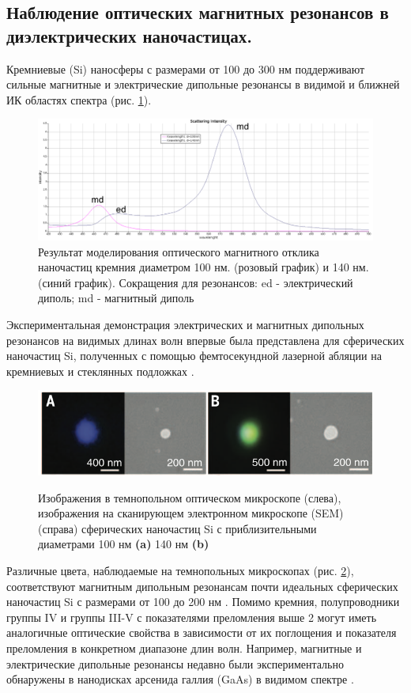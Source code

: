 \subsection*{Наблюдение оптических магнитных резонансов в диэлектрических наночастицах.}


Кремниевые (Si) наносферы с размерами от 100 до 300 нм поддерживают сильные магнитные и электрические дипольные резонансы в видимой и ближней ИК областях спектра (рис. \ref{fig2}). 
 \begin{figure}[h]
	\centering
	\includegraphics[width=1\linewidth]{images/graph1.png}
	\caption{Результат моделирования оптического магнитного отклика наночастиц кремния  диаметром 100 нм. (розовый график) и 140 нм. (синий график).  Сокращения для резонансов: ed - электрический диполь; md - магнитный диполь}
	\label{fig2}
\end{figure}
Экспериментальная демонстрация электрических и магнитных дипольных резонансов на видимых длинах волн впервые была представлена для сферических наночастиц Si, полученных с помощью фемтосекундной лазерной абляции на кремниевых и стеклянных подложках \cite{kuznetsov2012luk}. 
 \begin{figure}[h]
	\centering
	\includegraphics[width=0.7\linewidth]{images/fig2.png}
	\caption{ Изображения в темнопольном оптическом микроскопе (слева), изображения на сканирующем электронном микроскопе (SEM) (справа)  сферических наночастиц Si с приблизительными диаметрами 100 нм \textbf{(a)} 140 нм \textbf{(b)}} \cite{kuznetsov2012luk}
    \label{fig3}
\end{figure}
\hspace*{2mm}
Различные цвета, наблюдаемые на темнопольных микроскопах (рис. \ref{fig3}), соответствуют магнитным дипольным резонансам почти идеальных сферических наночастиц Si с размерами от 100 до 200 нм \cite{kuznetsov2012luk}.  Помимо кремния, полупроводники группы IV и группы III-V с показателями преломления выше 2 могут иметь аналогичные оптические свойства в зависимости от их поглощения и показателя преломления в конкретном диапазоне длин волн. Например, магнитные и электрические дипольные резонансы недавно были экспериментально обнаружены в нанодисках арсенида галлия (GaAs) в видимом спектре \cite{person2013demonstration}.



